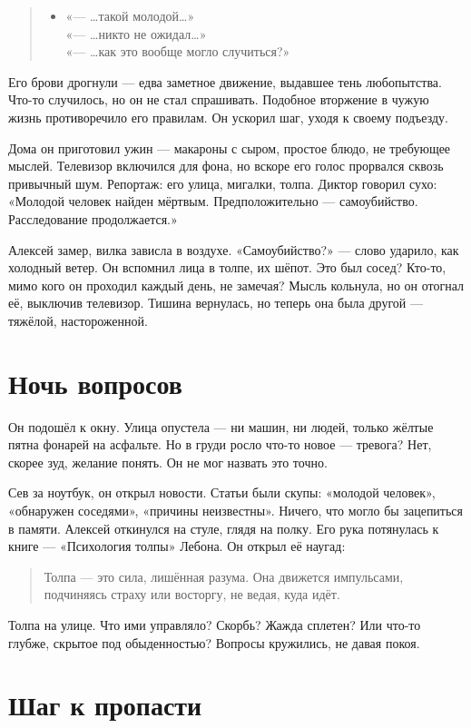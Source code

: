 \documentclass[12pt,a4paper]{book}
\newenvironment{dialogue}{\begin{quote}\itshape\begin{itemize}\item[]}{\end{itemize}\end{quote}}
\begin{document}
\begin{dialogue}
«--- \ldots такой молодой\ldots»\\[0.5em]
«--- \ldots никто не ожидал\ldots»\\[0.5em]
«--- \ldots как это вообще могло случиться?»
\end{dialogue}

Его брови дрогнули --- едва заметное движение, выдавшее тень любопытства. Что-то случилось, но он не стал спрашивать. Подобное вторжение в чужую жизнь противоречило его правилам. Он ускорил шаг, уходя к своему подъезду.

Дома он приготовил ужин --- макароны с сыром, простое блюдо, не требующее мыслей. Телевизор включился для фона, но вскоре его голос прорвался сквозь привычный шум. Репортаж: его улица, мигалки, толпа. Диктор говорил сухо: «Молодой человек найден мёртвым. Предположительно --- самоубийство. Расследование продолжается.»

Алексей замер, вилка зависла в воздухе. «Самоубийство?» --- слово ударило, как холодный ветер. Он вспомнил лица в толпе, их шёпот. Это был сосед? Кто-то, мимо кого он проходил каждый день, не замечая? Мысль кольнула, но он отогнал её, выключив телевизор. Тишина вернулась, но теперь она была другой --- тяжёлой, настороженной.

\section{Ночь вопросов}

Он подошёл к окну. Улица опустела --- ни машин, ни людей, только жёлтые пятна фонарей на асфальте. Но в груди росло что-то новое --- тревога? Нет, скорее зуд, желание понять. Он не мог назвать это точно.

Сев за ноутбук, он открыл новости. Статьи были скупы: «молодой человек», «обнаружен соседями», «причины неизвестны». Ничего, что могло бы зацепиться в памяти. Алексей откинулся на стуле, глядя на полку. Его рука потянулась к книге --- «Психология толпы» Лебона. Он открыл её наугад:

\begin{quote}
Толпа --- это сила, лишённая разума. Она движется импульсами, подчиняясь страху или восторгу, не ведая, куда идёт.
\end{quote}

Толпа на улице. Что ими управляло? Скорбь? Жажда сплетен? Или что-то глубже, скрытое под обыденностью? Вопросы кружились, не давая покоя.

\section{Шаг к пропасти}
\end{document}
